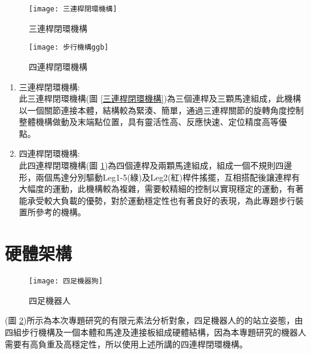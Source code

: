 \begin{figure}[htbp]
  \begin{minipage}[t]{0.5\linewidth}
    \centering
    \texttt{[image: 三連桿閉環機構]}
    \caption{三連桿閉環機構}
    \label{三連桿閉環機構}
  \end{minipage}
  \hfill
  \begin{minipage}[t]{0.4\linewidth}
    \centering
    \texttt{[image: 步行機構ggb]}
    \caption{四連桿閉環機構}
    \label{步行機構ggb}
  \end{minipage}
\end{figure}

\begin{enumerate}
\item 三連桿閉環機構:\\

此三連桿閉環機構(圖 \ref{三連桿閉環機構})為三個連桿及三顆馬達組成，此機構以一個關節連接本體，結構較為緊湊、簡單，通過三連桿關節的旋轉角度控制整體機構做動及末端點位置，具有靈活性高、反應快速、定位精度高等優點。\

\item 四連桿閉環機構:\\

此四連桿閉環機構(圖 \ref{步行機構ggb})為四個連桿及兩顆馬達組成，組成一個不規則四邊形，兩個馬達分別驅動Leg1-5(綠)及Leg2(紅)桿件搖擺，互相搭配後讓連桿有大幅度的運動，此機構較為複雜，需要較精細的控制以實現穩定的運動，有著能承受較大負載的優勢，對於運動穩定性也有著良好的表現，為此專題步行裝置所參考的機構。\\

\end{enumerate}

\section{硬體架構}
\begin{figure}[hbtp]
\begin{center}
\texttt{[image: 四足機器狗]}
\caption{\Large 四足機器人}\label{四足機器狗}
\end{center}
\end{figure}

(圖 \ref{四足機器狗})所示為本次專題研究的有限元素法分析對象，四足機器人的的站立姿態，由四組步行機構及一個本體和馬達及連接板組成硬體結構，因為本專題研究的機器人需要有高負重及高穩定性，所以使用上述所講的四連桿閉環機構。\

\newpage

